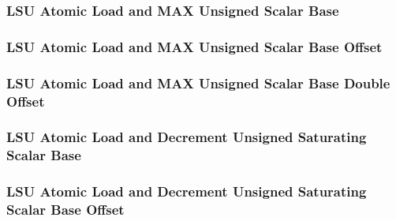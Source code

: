 

\subsubsection[{\small LSU Atomic Load and MAX Unsigned Scalar Base}]{LSU Atomic Load and MAX Unsigned Scalar Base} \label{sec:format-LSU-ALMAXUSB}



\subsubsection[{\small LSU Atomic Load and MAX Unsigned Scalar Base Offset}]{LSU Atomic Load and MAX Unsigned Scalar Base Offset} \label{sec:format-LSU-ALMAXUSB.O}



\subsubsection[{\small LSU Atomic Load and MAX Unsigned Scalar Base Double Offset}]{LSU Atomic Load and MAX Unsigned Scalar Base Double Offset} \label{sec:format-LSU-ALMAXUSB.D}



\subsubsection[{\small LSU Atomic Load and Decrement Unsigned Saturating Scalar Base}]{LSU Atomic Load and Decrement Unsigned Saturating Scalar Base} \label{sec:format-LSU-ALDUSSB}



\subsubsection[{\small LSU Atomic Load and Decrement Unsigned Saturating Scalar Base Offset}]{LSU Atomic Load and Decrement Unsigned Saturating Scalar Base Offset} \label{sec:format-LSU-ALDUSSB.O}

